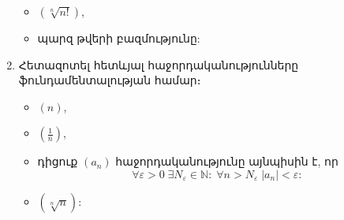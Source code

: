 \documentclass{article}
\begin{document}
\begin{enumerate}
\begin{itemize}
        \item $(\sqrt[n]{n!})$,\\
        \item պարզ թվերի բազմությունը:
    \end{itemize}
    \item Հետազոտել հետևյալ հաջորդականությունները ֆունդամենտալության համար։
    \begin{itemize}
        \item $\left(n\right)$,\\
        \item $\left(\frac{1}{n}\right)$,\\
        \item դիցուք $(a_n)$ հաջորդականությունը այնպիսին է, որ
        \[\forall \varepsilon > 0 \; \exists N_\varepsilon \in \mathbb{N}: \; \forall n > N_\varepsilon \; |a_n| < \varepsilon:\]
        \item $\left(\sqrt[n]{n}\right)$:
    \end{itemize}
\end{enumerate}
\end{document}
